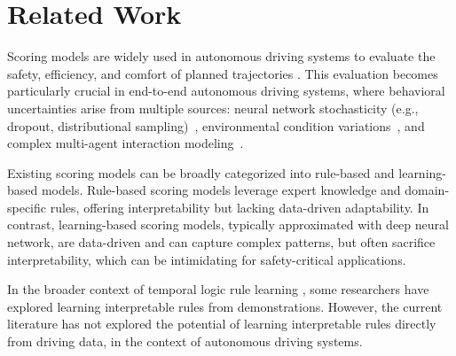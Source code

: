\section{Related Work}
Scoring models are widely used in autonomous driving systems to evaluate the safety, efficiency, and comfort of planned trajectories \cite{Dauner2023CORL,Karnchanachari2024TowardsLP,hu2023planning,xiao2021rule,wishart2020driving,junietz2018criticality,hekmatnejad2019encoding,Deng2023TARGETAS,Zhou2023SpecificationBasedAD,houston2021one,riedmaier2020survey,weng2020model,vasudevan2024planningadaptiveworldmodels,phan2022driving,huang2021driving,kuderer2015learning,wulfmeier2017large,silver2012learning,jiang2022efficient}. This evaluation becomes particularly crucial in end-to-end autonomous driving systems, where behavioral uncertainties arise from multiple sources: neural network stochasticity (e.g., dropout, distributional sampling)~\cite{hu2023planning}, environmental condition variations~\cite{hu2023planning}, and complex multi-agent interaction modeling~\cite{chen2024end}.

Existing scoring models can be broadly categorized into rule-based and learning-based models. Rule-based scoring models \cite{Dauner2023CORL,Karnchanachari2024TowardsLP,hu2023planning,xiao2021rule,wishart2020driving,junietz2018criticality,hekmatnejad2019encoding,Deng2023TARGETAS,Zhou2023SpecificationBasedAD,houston2021one,riedmaier2020survey} leverage expert knowledge and domain-specific rules, offering interpretability but lacking data-driven adaptability. In contrast, learning-based scoring models, typically approximated with deep neural network, \cite{weng2020model,vasudevan2024planningadaptiveworldmodels,phan2022driving,huang2021driving,kuderer2015learning,wulfmeier2017large,silver2012learning,jiang2022efficient} are data-driven and can capture complex patterns, but often sacrifice interpretability, which can be intimidating for safety-critical applications.

In the broader context of temporal logic rule learning \cite{bartocci2022survey}, some researchers have explored learning interpretable rules from demonstrations. However, the current literature has not explored the potential of learning interpretable rules directly from driving data, in the context of autonomous driving systems.

